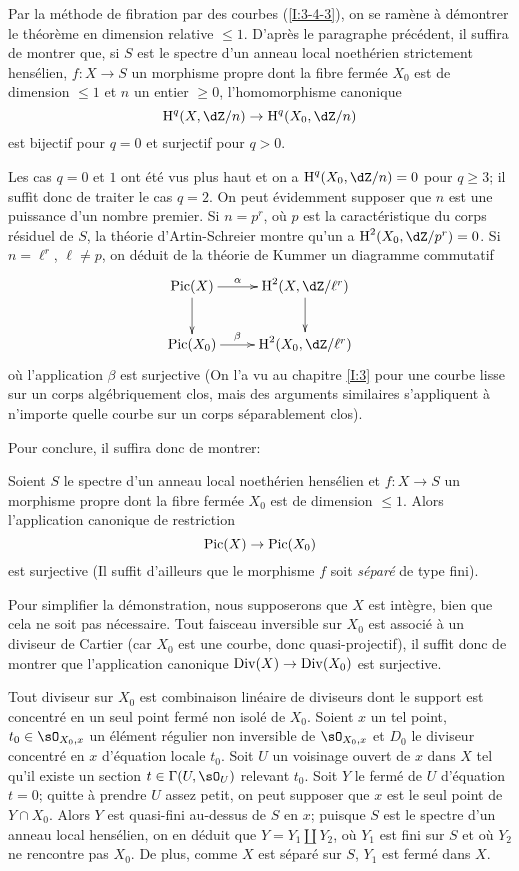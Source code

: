Par la méthode de fibration par des courbes (\ref{I:3-4-3}), on se ramène 
à démontrer le théorème en dimension relative $\leqslant 1$. D'après 
le paragraphe précédent, il suffira de montrer que, si $S$ est le spectre 
d'un anneau local noethérien strictement hensélien, $f:X\to S$ un 
morphisme propre dont la fibre fermée $X_0$ est de dimension $\leqslant 1$ 
et $n$ un entier $\geqslant 0$, l'homomorphisme canonique 
\[
  \h^q(X,\dZ/n) \to \h^q(X_0,\dZ/n)
\]
est bijectif pour $q=0$ et surjectif pour $q>0$. 

Les cas $q=0$ et $1$ ont été vus plus haut et on a $\h^q(X_0,\dZ/n) = 0$ 
pour $q\geqslant 3$; il suffit donc de traiter le cas $q=2$. On peut 
évidemment supposer que $n$ est une puissance d'un nombre premier. Si 
$n=p^r$, où $p$ est la caractéristique du corps résiduel de $S$, la 
théorie d'Artin-Schreier montre qu'un a $\h^2(X_0,\dZ/p^r) = 0$. Si 
$n=\ell^r$, $\ell\ne p$, on déduit de la théorie de Kummer un diagramme 
commutatif 
\[\xymatrix{
  \pic(X) \ar[d] \ar[r]^-\alpha 
    & \h^2(X,\dZ/\ell^r) \ar[d] \\
  \pic(X_0) \ar[r]^-\beta 
    & \h^2(X_0,\dZ/\ell^r)
}\]
où l'application $\beta$ est surjective (On l'a vu au chapitre \ref{I:3} pour 
une courbe lisse sur un corps algébriquement clos, mais des arguments 
similaires s'appliquent à n'importe quelle courbe sur un corps 
séparablement clos). 

Pour conclure, il suffira donc de montrer:





\begin{proposition}\label{I:4-4-1}
Soient $S$ le spectre d'un anneau local noethérien hensélien et $f:X\to S$ 
un morphisme propre dont la fibre fermée $X_0$ est de dimension 
$\leqslant 1$. Alors l'application canonique de restriction 
\[
  \operatorname{Pic}(X)\to \operatorname{Pic}(X_0)
\]
est surjective (Il suffit d'ailleurs que le morphisme $f$ soit 
\emph{séparé} de type fini). 
\end{proposition}

Pour simplifier la démonstration, nous supposerons que $X$ est intègre, 
bien que cela ne soit pas nécessaire. Tout faisceau inversible sur $X_0$ est 
associé à un diviseur de Cartier (car $X_0$ est une courbe, donc 
quasi-projectif), il suffit donc de montrer que l'application canonique 
$\operatorname{Div}(X)\to\operatorname{Div}(X_0)$ est surjective. 

Tout diviseur sur $X_0$ est combinaison linéaire de diviseurs dont le 
support est concentré en un seul point fermé non isolé de $X_0$. Soient 
$x$ un tel point, $t_0\in\sO_{X_0,x}$ un élément régulier non inversible 
de $\sO_{X_0,x}$ et $D_0$ le diviseur concentré en $x$ d'équation locale 
$t_0$. Soit $U$ un voisinage ouvert de $x$ dans $X$ tel qu'il existe un section 
$t\in \Gamma(U,\sO_U)$ relevant $t_0$. Soit $Y$ le fermé de $U$ d'équation 
$t=0$; quitte à prendre $U$ assez petit, on peut supposer que $x$ est le 
seul point de $Y\cap X_0$. Alors $Y$ est quasi-fini au-dessus de $S$ en $x$; 
puisque $S$ est le spectre d'un anneau local hensélien, on en déduit que 
$Y=Y_1\amalg Y_2$, où $Y_1$ est fini sur $S$ et où $Y_2$ ne rencontre pas 
$X_0$. De plus, comme $X$ est séparé sur $S$, $Y_1$ est fermé dans $X$. 

